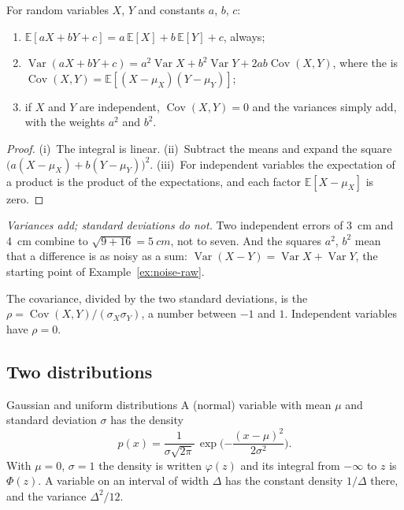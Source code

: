 \begin{theorem}
\label{thm:E-linear}
For random variables $X$, $Y$ and constants $a$, $b$, $c$:
\begin{enumerate}[label=(\roman*)]
  \item $\mathbb{E}[aX + bY + c] = a\,\mathbb{E}[X] + b\,\mathbb{E}[Y] + c$, always;
  \item $\operatorname{Var}(aX + bY + c) = a^2\operatorname{Var}X + b^2\operatorname{Var}Y + 2ab\operatorname{Cov}(X, Y)$, where the  is $\operatorname{Cov}(X, Y) = \mathbb{E}[(X - \mu_X)(Y - \mu_Y)]$;
  \item if $X$ and $Y$ are independent, $\operatorname{Cov}(X, Y) = 0$ and the variances simply add, with the weights $a^2$ and $b^2$.
\end{enumerate}
\end{theorem}
\begin{proof}
(i)~The integral is linear. (ii)~Subtract the means and expand the square $\big(a(X - \mu_X) + b(Y - \mu_Y)\big)^2$. (iii)~For independent variables the expectation of a product is the product of the expectations, and each factor $\mathbb{E}[X - \mu_X]$ is zero.
\end{proof}

\emph{Variances add; standard deviations do not.} Two independent errors of \SI{3}{cm} and \SI{4}{cm} combine to $\sqrt{9 + 16} = \SI{5}{cm}$, not to seven. And the squares $a^2$, $b^2$ mean that a difference is as noisy as a sum: $\operatorname{Var}(X - Y) = \operatorname{Var}X + \operatorname{Var}Y$, the starting point of Example~\ref{ex:noise-raw}.

The covariance, divided by the two standard deviations, is the  $\rho = \operatorname{Cov}(X, Y)/(\sigma_X\sigma_Y)$, a number between $-1$ and $1$. Independent variables have $\rho = 0$.

\subsection{Two distributions}

\begin{definition}{Gaussian and uniform distributions}
A  (normal) variable with mean $\mu$ and standard deviation $\sigma$ has the density
\begin{equation}
  p(x) = \frac{1}{\sigma\sqrt{2\pi}}\,\exp\!\Big({-\frac{(x - \mu)^2}{2\sigma^2}}\Big) .
\end{equation}
With $\mu = 0$, $\sigma = 1$ the density is written $\varphi(z)$ and its integral from $-\infty$ to $z$ is $\Phi(z)$. A variable  on an interval of width $\Delta$ has the constant density $1/\Delta$ there, and the variance $\Delta^2/12$.
\end{definition}

